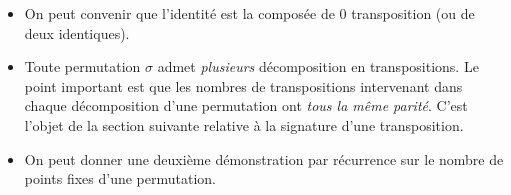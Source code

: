 \begin{rems}
 \begin{itemize}
\item On peut convenir que l'identité est la composée de $0$ transposition (ou de deux identiques).
\item Toute permutation $\sigma$ admet \emph{plusieurs} décomposition en transpositions. Le point important est que les nombres de transpositions intervenant dans chaque décomposition d'une permutation ont \emph{tous la même parité}. C'est l'objet de la section suivante relative à la signature d'une transposition.
\item On peut donner une deuxième démonstration par récurrence sur le nombre de points fixes d'une permutation.
 \end{itemize}
\end{rems}

